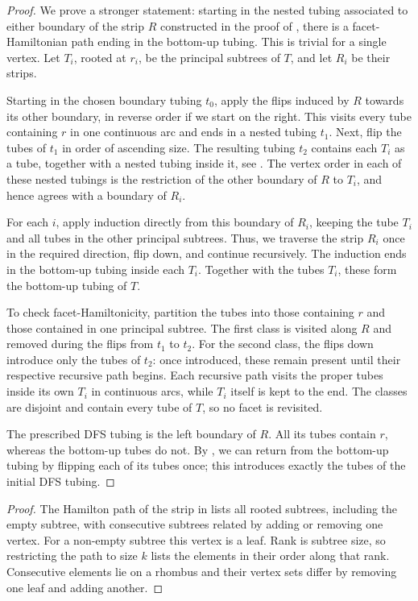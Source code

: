 \documentclass[fontsize=11pt,a4paper,DIV=12]{scrartcl}
\begin{document}
\treeassociahedrafh*
	\begin{proof}
		We prove a stronger statement: starting in the nested tubing associated to either boundary of the strip $R$ constructed in the proof of , there is a facet-Hamiltonian path ending in the bottom-up tubing. This is trivial for a single vertex. Let $T_i$, rooted at $r_i$, be the principal subtrees of $T$, and let $R_i$ be their strips.

		Starting in the chosen boundary tubing $t_0$, apply the flips induced by $R$ towards its other boundary, in reverse order if we start on the right. This visits every tube containing $r$ in one continuous arc and ends in a nested tubing $t_1$. Next, flip the tubes of $t_1$ in order of ascending size. The resulting tubing $t_2$ contains each $T_i$ as a tube, together with a nested tubing inside it, see . The vertex order in each of these nested tubings is the restriction of the other boundary of $R$ to $T_i$, and hence agrees with a boundary of $R_i$.

		For each $i$, apply induction directly from this boundary of $R_i$, keeping the tube $T_i$ and all tubes in the other principal subtrees. Thus, we traverse the strip $R_i$ once in the required direction, flip down, and continue recursively. The induction ends in the bottom-up tubing inside each $T_i$. Together with the tubes $T_i$, these form the bottom-up tubing of $T$.

		To check facet-Hamiltonicity, partition the tubes into those containing $r$ and those contained in one principal subtree. The first class is visited along $R$ and removed during the flips from $t_1$ to $t_2$. For the second class, the flips down introduce only the tubes of $t_2$: once introduced, these remain present until their respective recursive path begins. Each recursive path visits the proper tubes inside its own $T_i$ in continuous arcs, while $T_i$ itself is kept to the end. The classes are disjoint and contain every tube of $T$, so no facet is revisited.

		The prescribed DFS tubing is the left boundary of $R$. All its tubes contain $r$, whereas the bottom-up tubes do not. By , we can return from the bottom-up tubing by flipping each of its tubes once; this introduces exactly the tubes of the initial DFS tubing.
	\end{proof}

	\subtreecodes*
	\begin{proof}
		The Hamilton path of the strip in  lists all rooted subtrees, including the empty subtree, with consecutive subtrees related by adding or removing one vertex. For a non-empty subtree this vertex is a leaf. Rank is subtree size, so restricting the path to size $k$ lists the elements in their order along that rank. Consecutive elements lie on a rhombus and their vertex sets differ by removing one leaf and adding another.
	\end{proof}
\end{document}
